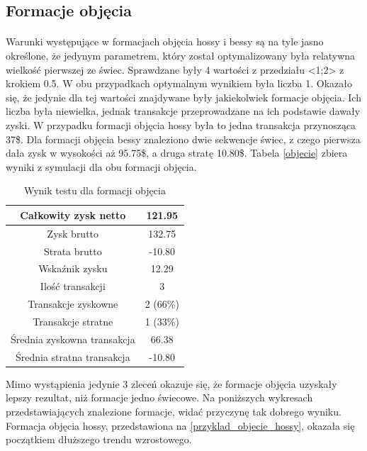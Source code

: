 \documentclass[pdflatex,11pt]{aghdpl}
\begin{document}
\subsection{Formacje objęcia}
\paragraph{}

Warunki występujące w formacjach objęcia hossy i bessy są na tyle jasno określone, że jedynym parametrem, który został optymalizowany była relatywna wielkość pierwszej ze świec. Sprawdzane były 4 wartości z przedziału <1;2> z krokiem 0.5. W obu przypadkach optymalnym wynikiem była liczba 1. Okazało się, że jedynie dla tej wartości znajdywane były jakiekolwiek formacje objęcia. Ich liczba była niewielka, jednak transakcje przeprowadzane na ich podstawie dawały zyski. W przypadku formacji objęcia hossy była to jedna transakcja przynosząca 37\$. Dla formacji objęcia bessy znaleziono dwie sekwencje świec, z czego pierwsza dała zysk w wysokości aż 95.75\$, a druga stratę 10.80\$. Tabela \ref{objecie} zbiera wyniki z symulacji dla obu formacji objęcia.
\begin{table}[h!]
\caption{Wynik testu dla formacji objęcia}
\begin{center}
\begin{tabular}{|c|c|}
\hline 
Całkowity zysk netto & 121.95\\
\hline
Zysk brutto & 132.75 \\
\hline
Strata brutto & -10.80 \\
\hline
Wskaźnik zysku & 12.29 \\
\hline
\hline
Ilość transakcji & 3 \\
\hline
Transakcje zyskowne & 2 (66\%) \\
\hline
Transakcje stratne & 1 (33\%) \\
\hline
\hline
Średnia zyskowna transakcja & 66.38 \\
\hline
Średnia stratna transakcja & -10.80 \\
\hline
\end{tabular} 
\label{raport_objecie}
\end{center}
\end{table}
Mimo wystąpienia jedynie 3 zleceń okazuje się, że formacje objęcia uzyskały lepszy rezultat, niż formacje jedno świecowe. Na poniższych wykresach przedstawiających znalezione formacje, widać przyczynę tak dobrego wyniku. Formacja objęcia hossy, przedstawiona na \ref{przyklad_objecie_hossy}, okazała się początkiem dłuższego trendu wzrostowego. 
\end{document}
